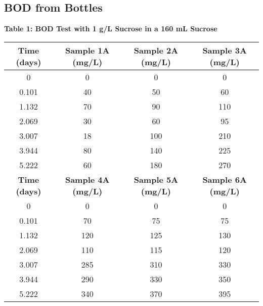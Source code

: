 \pgfplotsset{width=12cm, compat=1.18}
\renewcommand\arraystretch{1.5}
\subsection{BOD from Bottles}
\begin{center}

{\large {\bf Table 1: BOD Test with 1 g/L Sucrose in a 160 mL Sucrose\\}}
\vspace{2mm}
\begin{tabular}{|cccc|}
    \hline
    \textbf{Time (days)} & \textbf{Sample 1A (mg/L)} & \textbf{Sample 2A (mg/L)} & \textbf{Sample 3A (mg/L)}  \\\hline
    0                    & 0                         & 0                         & 0                          \\
    0.101             & 40                        & 50                        & 60                         \\
    1.132             & 70                        & 90                        & 110                        \\
    2.069             & 30                        & 60                        & 95                         \\
    3.007             & 18                        & 100                       & 210                        \\
    3.944            & 80                        & 140                       & 225                        \\
    5.222             & 60                        & 180                       & 270                        \\\hline
    \hline
    \textbf{Time (days)} & \textbf{Sample 4A (mg/L)} & \textbf{Sample 5A (mg/L)} & \textbf{Sample 6A (mg/L)}  \\\hline
    0                    & 0                         & 0                         & 0                          \\
    0.101             & 70                        & 75                        & 75                         \\
    1.132             & 120                       & 125                       & 130                        \\
    2.069             & 110                       & 115                       & 120                        \\
    3.007             & 285                       & 310                       & 330                        \\
    3.944             & 290                       & 330                       & 350                        \\
    5.222             & 340                       & 370                       & 395      \\\hline       
\end{tabular}
\vspace{5mm}
\pgfplotsset{width=11cm, compat=1.18}


\end{center}
